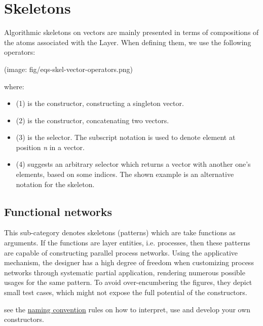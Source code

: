 \section{Skeletons}
Algorithmic skeletons on vectors are mainly presented in terms
 of compositions of the atoms associated with the
  Layer. When defining them,
 we use the following operators:\par
(image: fig/eqs-skel-vector-operators.png)\par
where:\par
\begin{itemize}
\item
(1) is the  constructor, constructing a singleton vector.\par

\item
(2) is the \haddockid{<++>} constructor, concatenating two vectors.\par

\item
(3) is the  selector. The subscript notation is used to
 denote element at position \emph{n} in a vector.\par

\item
(4) suggests an arbitrary selector which returns a vector with
 another one's elements, based on some indices. The shown example
 is an alternative notation for the  skeleton.\par

\end{itemize}

\subsection{Functional networks}
This sub-category denotes skeletons (patterns) which are take
 functions as arguments. If the functions are
  layer entities, i.e. processes, then these
 patterns are capable of constructing parallel process
 networks. Using the applicative mechanism, the designer has a
 high degree of freedom when customizing process networks through
 systematic partial application, rendering numerous possible
 usages for the same pattern. To avoid over-encumbering the
 figures, they depict small test cases, which might not expose the
 full potential of the constructors.\par
see the \href{ForSyDe-Atom.html#naming_conv}{naming convention} rules
 on how to interpret, use and develop your own constructors.\par

